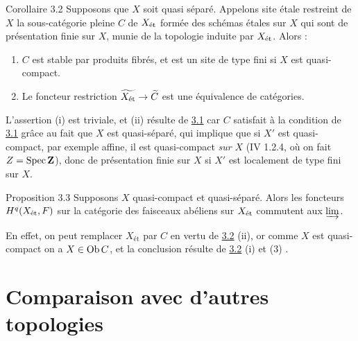 \documentclass[10pt]{../fichiers-configuration-latex/smfart}
\begin{document}
\begin{enonce*}{Corollaire 3.2}
Supposons que $X$ soit quasi séparé. Appelons site étale restreint
de $X$ la sous-catégorie pleine $C$ de $X_{\text{\rm ét}}$ formée
des schémas étales sur $X$ qui sont de présentation finie sur $X$,
munie de la topologie induite par $X_{\text{\rm ét}}$. Alors :
\begin{enumerate}
\renewcommand{\theenumi}{\roman{enumi}}
\renewcommand{\labelenumi}{(\theenumi)}
\item $C$ est stable par produits fibrés, et est un site de type fini
si $X$ est quasi-compact.

\item Le foncteur restriction $\widetilde{X_{\text{\rm ét}}} \to
\widetilde{C}$ est une équivalence de catégories.
\end{enumerate}
\end{enonce*}

L'assertion (i) est triviale, et (ii) résulte de \hyperref[VII.prop3.1]{3.1} car $C$ satisfait
à la condition de \hyperref[VII.prop3.1]{3.1} grâce au fait que $X$ est quasi-séparé, qui
implique que si $X'$ est quasi-compact, par exemple affine, il est
quasi-compact \emph{sur} $X$ (\EGA IV 1.2.4, où on fait $Z = \operatorname{Spec}
\mathbf{Z}$), donc de présentation finie sur $X$ si $X'$ est
localement de type fini sur $X$.

\begin{enonce*}{Proposition 3.3}
Supposons $X$ quasi-compact et quasi-séparé. Alors les foncteurs
$H^{q} (X_{\text{\rm ét}}, F)$ sur la catégorie des faisceaux
abéliens sur $X_{\text{\rm ét}}$ commutent aux $\varinjlim$.
\end{enonce*}

En effet, on peut remplacer $X_{\text{ét}}$ par $C$ en vertu de
\hyperref[VII.cor3.2]{3.2} (ii), or comme $X$ est quasi-compact on a $X \in
\operatorname{Ob} C$, et la conclusion résulte de \hyperref[VII.cor3.2]{3.2} (i) et
 (3) .

\section{Comparaison avec d'autres topologies}

\setcounter{subsection}{-1}
\subsection{}
\end{document}
